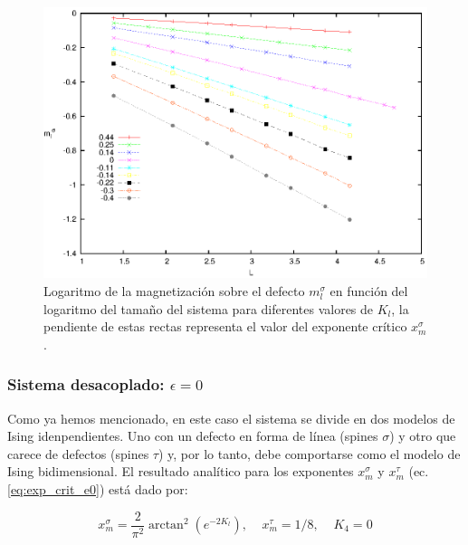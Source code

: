 \begin{figure}[h!]
\begin{center}
\includegraphics[width=\figwidth]{graf/exp/mls_vs_L_e0.eps}
\end{center}
\caption{Logaritmo de la magnetización sobre el defecto $m_{l}^{\sigma}$ en función del logaritmo del tamaño del sistema para diferentes valores de $K_{l}$,
la pendiente de estas rectas representa el valor del exponente cr\'itico $x_{m}^{\sigma}$.}
\label{fig:mls_vs_L_e0}
\end{figure}

\subsubsection{Sistema desacoplado: $\epsilon=0$}

Como ya hemos mencionado, en este caso el sistema se divide en dos modelos de Ising idenpendientes. Uno con un defecto en forma de l\'inea
 (spines $\sigma$) y otro que carece de defectos (spines $\tau$) y, por lo tanto, debe comportarse como el modelo de Ising bidimensional.
El resultado analítico para los exponentes $x_{m}^{\sigma}$ y $x_{m}^{\tau}$ (ec. \ref{eq:exp_crit_e0}) est\'a dado por:

\begin{equation*}
	\label{eq:exp_crit_e0}
	x_{m}^{\sigma} = \frac{2}{\pi^{2}}\arctan^{2}(e^{-2K_{l}}) , \; \; \; \; x_{m}^{\tau}=1/8, \; \; \; \; K_{4}=0
\end{equation*}

